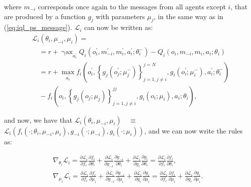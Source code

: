 \documentclass{article}
\begin{document}
where $m_{-i}$ corresponds once again to the messages from all agents except $i$, that are produced by a function $g_j$ with parameters $\mu_j$, in the same way as in (\ref{eq:iql_ps_message}). $\mathcal{L}_i$ can now be written as:
\begin{equation}
\begin{aligned}
& \mathcal{L}_i\left(\theta_i, \mu_{-i}, \mu_i\right)= \\
& \quad=r+\operatorname{\gamma ax}_{a_i^{\prime}} Q_i\left(o_i^{\prime}, m_{-i}^{\prime}, m_i^{\prime}, a_i^{\prime} ; \theta_i^{-}\right)-Q_i\left(o_i, m_{-i}, m_i, a_i ; \theta_i\right) \\
& \quad=r+\max _{a_i^{\prime}} f_i\left(o_i^{\prime},\left\{g_j\left(o_j^{\prime} ; \mu_j^{-}\right)\right\}_{j=1, j \neq i}^{j=N}, g_i\left(o_i^{\prime} ; \mu_i^{-}\right), a_i^{\prime} ; \theta_i^{-}\right) \\
& \quad-f_i\left(o_i,\left\{g_j\left(o_j ; \mu_j\right)\right\}_{j=1, j \neq i}^{j j}, g_i\left(o_i ; \mu_i\right), a_i ; \theta_i\right),
\end{aligned}
\end{equation}

and now, we have that $\mathcal{L}_i\left(\theta_i, \mu_{-i}, \mu_i\right) \quad \equiv$ $\mathcal{L}_i\left(f_i\left(\cdot ; \theta_i, \mu_{-i}, \mu_i\right), g_{-i}\left(\cdot ; \mu_{-i}\right), g_i\left(\cdot ; \mu_i\right)\right)$, and we can now write the rules as:

\begin{equation}\label{eq:q_iql_nps}
\begin{gathered}
\nabla_{\theta_i} \mathcal{L}_i=\frac{\partial \mathcal{L}_i}{\partial f_i} \frac{\partial f_i}{\partial \theta_i}+\frac{\partial \mathcal{L}_i}{\partial g_{-i}} \frac{\partial g_{-i}}{\partial \theta_i}+\frac{\partial \mathcal{L}_i}{\partial g_i} \frac{\partial g_i}{\partial \theta_i}=\frac{\partial \mathcal{L}_i}{\partial f_i} \frac{\partial f_i}{\partial \theta_i}, \\
\nabla_{\mu_i} \mathcal{L}_i=\frac{\partial \mathcal{L}_i}{\partial f_i} \frac{\partial f_i}{\partial \mu_i}+\frac{\partial \mathcal{L}_i}{\partial g_{-i}} \frac{\partial g_{-i}}{\partial \mu_i}+\frac{\partial \mathcal{L}_i}{\partial g_i} \frac{\partial g_i}{\partial \mu_i}=\frac{\partial \mathcal{L}_i}{\partial f_i} \frac{\partial f_i}{\partial \mu_i}+\frac{\partial \mathcal{L}_i}{\partial g_i} \frac{\partial g_i}{\partial \mu_i} .
\end{gathered}
\end{equation}
\end{document}
